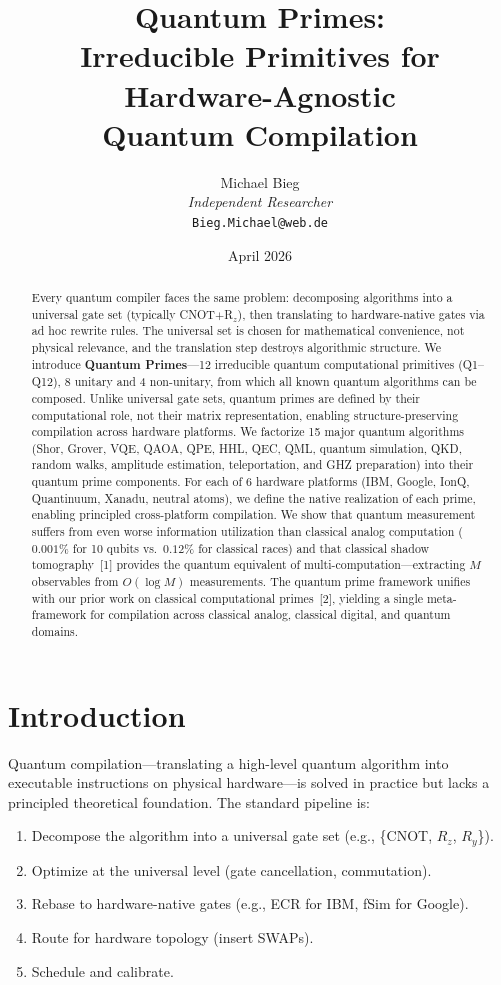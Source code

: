 \documentclass[11pt]{article}
\title{Quantum Primes:\\Irreducible Primitives for Hardware-Agnostic\\Quantum Compilation}
\author{Michael Bieg\\
\textit{Independent Researcher}\\
\texttt{Bieg.Michael@web.de}}
\date{April 2026}
\begin{document}
\maketitle

\begin{abstract}
Every quantum compiler faces the same problem: decomposing algorithms into a universal gate set (typically CNOT$+$R$_z$), then translating to hardware-native gates via ad hoc rewrite rules. The universal set is chosen for mathematical convenience, not physical relevance, and the translation step destroys algorithmic structure. We introduce \textbf{Quantum Primes}---12 irreducible quantum computational primitives (Q1--Q12), 8 unitary and 4 non-unitary, from which all known quantum algorithms can be composed. Unlike universal gate sets, quantum primes are defined by their computational role, not their matrix representation, enabling structure-preserving compilation across hardware platforms. We factorize 15 major quantum algorithms (Shor, Grover, VQE, QAOA, QPE, HHL, QEC, QML, quantum simulation, QKD, random walks, amplitude estimation, teleportation, and GHZ preparation) into their quantum prime components. For each of 6 hardware platforms (IBM, Google, IonQ, Quantinuum, Xanadu, neutral atoms), we define the native realization of each prime, enabling principled cross-platform compilation. We show that quantum measurement suffers from even worse information utilization than classical analog computation ($0.001\%$ for 10 qubits vs.\ $0.12\%$ for classical races) and that classical shadow tomography~[1] provides the quantum equivalent of multi-computation---extracting $M$ observables from $O(\log M)$ measurements. The quantum prime framework unifies with our prior work on classical computational primes~[2], yielding a single meta-framework for compilation across classical analog, classical digital, and quantum domains.
\end{abstract}

\section{Introduction}

Quantum compilation---translating a high-level quantum algorithm into executable instructions on physical hardware---is solved in practice but lacks a principled theoretical foundation. The standard pipeline is:

\begin{enumerate}[leftmargin=*]
\item Decompose the algorithm into a universal gate set (e.g., \{CNOT, $R_z$, $R_y$\}).
\item Optimize at the universal level (gate cancellation, commutation).
\item Rebase to hardware-native gates (e.g., ECR for IBM, fSim for Google).
\item Route for hardware topology (insert SWAPs).
\item Schedule and calibrate.
\end{enumerate}
\end{document}
